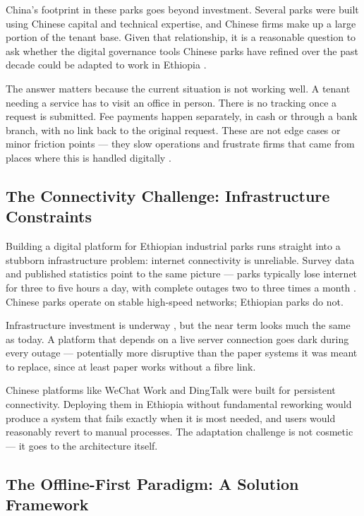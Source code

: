 China's footprint in these parks goes beyond investment. Several parks were built using Chinese capital and technical expertise, and Chinese firms make up a large portion of the tenant base. Given that relationship, it is a reasonable question to ask whether the digital governance tools Chinese parks have refined over the past decade could be adapted to work in Ethiopia \citep{Negesa2022}.

The answer matters because the current situation is not working well. A tenant needing a service has to visit an office in person. There is no tracking once a request is submitted. Fee payments happen separately, in cash or through a bank branch, with no link back to the original request. These are not edge cases or minor friction points --- they slow operations and frustrate firms that came from places where this is handled digitally \citep{Guteta2022, Guteta2023}.

\subsection{The Connectivity Challenge: Infrastructure Constraints}

Building a digital platform for Ethiopian industrial parks runs straight into a stubborn infrastructure problem: internet connectivity is unreliable. Survey data and published statistics point to the same picture --- parks typically lose internet for three to five hours a day, with complete outages two to three times a month \citep{Ethiotelecom2023, ITU2023}. Chinese parks operate on stable high-speed networks; Ethiopian parks do not.

Infrastructure investment is underway \citep{WorldBank2022}, but the near term looks much the same as today. A platform that depends on a live server connection goes dark during every outage --- potentially more disruptive than the paper systems it was meant to replace, since at least paper works without a fibre link.

Chinese platforms like WeChat Work and DingTalk were built for persistent connectivity. Deploying them in Ethiopia without fundamental reworking would produce a system that fails exactly when it is most needed, and users would reasonably revert to manual processes. The adaptation challenge is not cosmetic --- it goes to the architecture itself.

\subsection{The Offline-First Paradigm: A Solution Framework}

